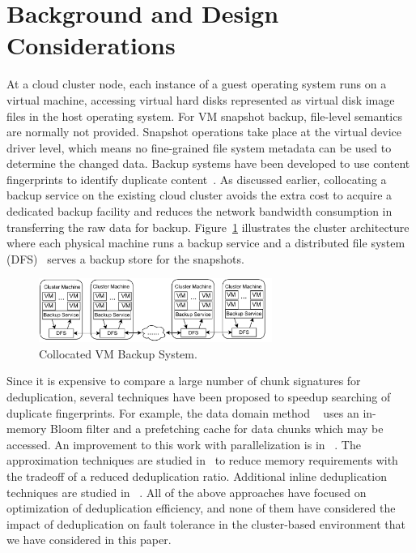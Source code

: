 \section{Background and Design Considerations}
\label{sect:background}
At a cloud cluster node, each instance of a guest operating system runs on a virtual machine, accessing virtual hard disks 
represented as virtual disk image files in the host operating system.
For VM snapshot backup, file-level semantics are normally not provided.
Snapshot operations take place at the virtual device driver level, which
means no fine-grained file system metadata can be used to determine the changed data. 
Backup systems have been developed to use content fingerprints to identify duplicate
content~\cite{venti02,Rhea2008}.  
As discussed earlier, collocating a backup service on the existing
cloud cluster avoids the extra cost to acquire a dedicated backup facility
and reduces the network bandwidth consumption in transferring the
raw data for backup. 
Figure~\ref{fig:collocated} illustrates the cluster architecture where
each physical machine runs a backup service and a distributed file system (DFS)~\cite{googlefs03,hdfs10} 
serves a backup store  for the snapshots.

\begin{figure}[htb]
    \centering
    \includegraphics[width=3in]{images/colocated-arch}
    \caption{Collocated VM Backup System.}
    \label{fig:collocated}
\end{figure}

Since it is expensive to compare a large number of chunk signatures for deduplication,
several techniques have been proposed to speedup searching of duplicate
fingerprints. For example, the data domain method ~\cite{bottleneck08} 
uses  an in-memory Bloom filter and a prefetching cache for data chunks  which may be
accessed.  An improvement to this work with parallelization is in ~\cite{MAD210,DEBAR}.
The approximation techniques are studied in~\cite{extreme_binning09,Guo2011,WeiZhangIEEE}  
to reduce memory requirements with the tradeoff of a reduced deduplication ratio.
Additional inline deduplication techniques are studied in ~\cite{sparseindex09,Guo2011,idedup}. 
All of the above approaches have focused on optimization of deduplication
efficiency, and none of them have considered the impact
of deduplication on fault tolerance in the cluster-based environment that we have considered
in this paper.

